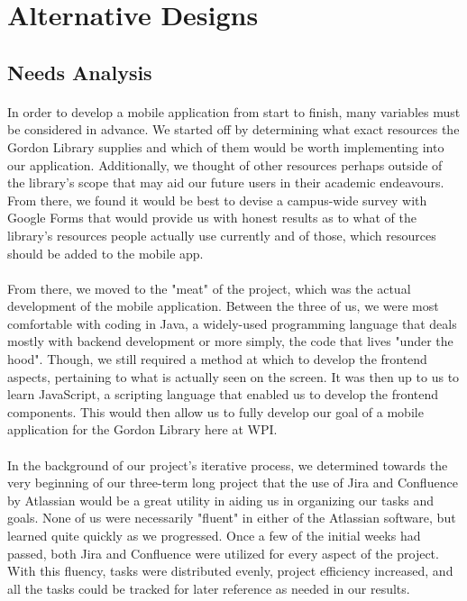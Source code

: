 \section{Alternative Designs}
    \subsection{Needs Analysis}  %
    \paragraph{}
    In order to develop a mobile application from start to finish, many variables must be considered in advance. We started off by determining what exact resources the Gordon Library supplies and which of them would be worth implementing into our application. Additionally, we thought of other resources perhaps outside of the library's scope that may aid our future users in their academic endeavours. From there, we found it would be best to devise a campus-wide survey with Google Forms that would provide us with honest results as to what of the library's resources people actually use currently and of those, which resources should be added to the mobile app.
    
    
    
    \paragraph{}
    From there, we moved to the "meat" of the project, which was the actual development of the mobile application. Between the three of us, we were most comfortable with coding in Java, a widely-used programming language that deals mostly with backend development or more simply, the code that lives "under the hood". Though, we still required a method at which to develop the frontend aspects, pertaining to what is actually seen on the screen. It was then up to us to learn JavaScript, a scripting language that enabled us to develop the frontend components. This would then allow us to fully develop our goal of a mobile application for the Gordon Library here at WPI.
    \paragraph{}
    In the background of our project's iterative process, we determined towards the very beginning of our three-term long project that the use of Jira and Confluence by Atlassian would be a great utility in aiding us in organizing our tasks and goals. None of us were necessarily "fluent" in either of the Atlassian software, but learned quite quickly as we progressed. Once a few of the initial weeks had passed, both Jira and Confluence were utilized for every aspect of the project. With this fluency, tasks were distributed evenly, project efficiency increased, and all the tasks could be tracked for later reference as needed in our results.
    

